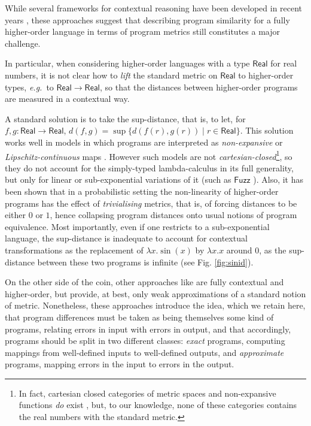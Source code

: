 While several frameworks  for contextual reasoning have been developed in recent years \cite{10.1145/1932681.1863568,Gaboardi_2013,Azevedo_de_Amorim_2017,chaudhuri, dallago:differential-stlc}, these approaches suggest that describing program similarity for a fully higher-order language in terms of program metrics still constitutes a major challenge. 

In particular, when considering higher-order languages with a type $\mathsf{Real}$ for real numbers, it is not clear how to \emph{lift} the standard metric on $\mathsf{Real}$  
 to higher-order types, \emph{e.g.}~to $\mathsf{Real}\to \mathsf{Real}$, so that the distances between higher-order programs are measured in a contextual way.



A standard solution is to take the sup-distance, that is, to let, for $f,g:\mathsf{Real}\to \mathsf{Real}$, $d(f,g)=\sup\{d(f(r),g(r))\mid r\in \mathsf{Real}\}$. This solution works well in models in which programs are interpreted as \emph{non-expansive} or \emph{Lipschitz-continuous} maps \cite{Hofmann2014, Azevedo_de_Amorim_2017}. However such models are not \emph{cartesian-closed}\footnote{In fact, cartesian closed categories of metric spaces and non-expansive functions \emph{do} exist \cite{Escardo1999, Stubbe2009}, but, to our knowledge, none of these categories contains the real numbers with the standard metric.}, so they do not account for 
 the simply-typed lambda-calculus in its full generality, but only for linear or sub-exponential variations of it (such as $\mathsf{Fuzz}$ \cite{10.1145/1932681.1863568,Gaboardi_2013,Azevedo_de_Amorim_2017}).
 Also, it has been shown \cite{10.1109/LICS.2015.64} that in a probabilistic setting the non-linearity of higher-order programs has the effect of \emph{trivialising} metrics, that is, of forcing distances to be either $0$ or $1$, hence collapsing program distances onto usual notions of program equivalence.
Most importantly, even if one restricts to a sub-exponential language, the sup-distance is inadequate to account for contextual transformations as the replacement of $\lambda x.\sin(x)$ by $\lambda x.x$ around $0$, as the sup-distance between these two programs is infinite (see Fig. \ref{fig:sinid}). 
 
 
On the other side of the coin, other approaches like \cite{chaudhuri, dallago:differential-stlc} are fully contextual and higher-order, but provide, at best, only weak approximations of a standard notion of metric.  
 Nonetheless, these approaches introduce the idea, which we retain here, that program differences must be taken as being themselves some kind of programs, relating errors in input with errors in  output, and that accordingly, programs should be split in two different classes: \emph{exact} programs, computing mappings from well-defined inputs to well-defined outputs, and \emph{approximate} programs, mapping errors in the input to errors in the output.


